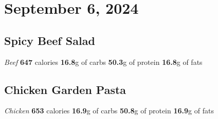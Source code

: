 \documentclass{article}%
\begin{document}
\section*{September 6, 2024}%
\label{sec:September6,2024}%
\begin{paracol}[2]{2}%
\sloppy%
\subsection*{Spicy Beef Salad}%
\label{subsec:SpicyBeefSalad}%
\textit{Beef}%
\newline%
\newline%
\textbf{647} calories%
\newline%
\textbf{16.8}g of carbs%
\newline%
\textbf{50.3}g of protein%
\newline%
\textbf{16.8}g of fats%
\newline%
\switchcolumn

%
\subsection*{Chicken Garden Pasta}%
\label{subsec:ChickenGardenPasta}%
\textit{Chicken}%
\newline%
\newline%
\textbf{653} calories%
\newline%
\textbf{16.9}g of carbs%
\newline%
\textbf{50.8}g of protein%
\newline%
\textbf{16.9}g of fats%
\newline%
\switchcolumn

%
\end{paracol}

%
\end{document}
